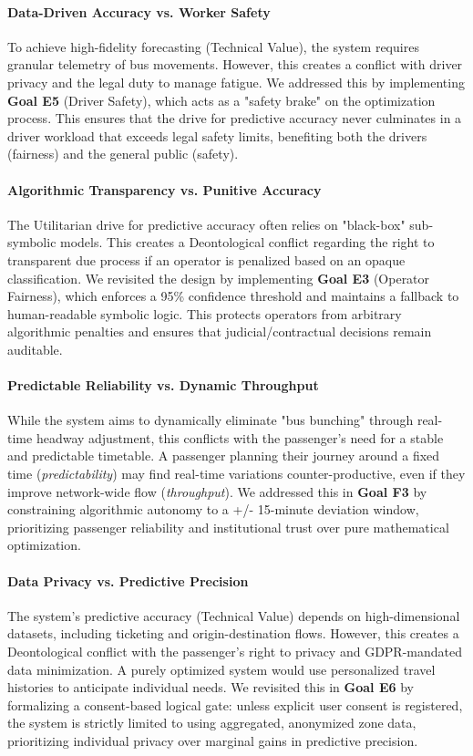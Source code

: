 \documentclass[]
{UCD_CS_41820_Report}
\begin{document}
\paragraph{Data-Driven Accuracy vs. Worker Safety}
To achieve high-fidelity forecasting (Technical Value), the system requires granular telemetry of bus movements. However, this creates a conflict with driver privacy and the legal duty to manage fatigue. We addressed this by implementing \textbf{Goal E5} (Driver Safety), which acts as a "safety brake" on the optimization process. This ensures that the drive for predictive accuracy never culminates in a driver workload that exceeds legal safety limits, benefiting both the drivers (fairness) and the general public (safety).

\paragraph{Algorithmic Transparency vs. Punitive Accuracy}
The Utilitarian drive for predictive accuracy often relies on "black-box" sub-symbolic models. This creates a Deontological conflict regarding the right to transparent due process if an operator is penalized based on an opaque classification. We revisited the design by implementing \textbf{Goal E3} (Operator Fairness), which enforces a 95\% confidence threshold and maintains a fallback to human-readable symbolic logic. This protects operators from arbitrary algorithmic penalties and ensures that judicial/contractual decisions remain auditable.

\paragraph{Predictable Reliability vs. Dynamic Throughput}
While the system aims to dynamically eliminate "bus bunching" through real-time headway adjustment, this conflicts with the passenger’s need for a stable and predictable timetable. A passenger planning their journey around a fixed time (\textit{predictability}) may find real-time variations counter-productive, even if they improve network-wide flow (\textit{throughput}). We addressed this in \textbf{Goal F3} by constraining algorithmic autonomy to a +/- 15-minute deviation window, prioritizing passenger reliability and institutional trust over pure mathematical optimization.

\paragraph{Data Privacy vs. Predictive Precision}
The system’s predictive accuracy (Technical Value) depends on high-dimensional datasets, including ticketing and origin-destination flows. However, this creates a Deontological conflict with the passenger's right to privacy and GDPR-mandated data minimization. A purely optimized system would use personalized travel histories to anticipate individual needs. We revisited this in \textbf{Goal E6} by formalizing a consent-based logical gate: unless explicit user consent is registered, the system is strictly limited to using aggregated, anonymized zone data, prioritizing individual privacy over marginal gains in predictive precision.
\end{document}
